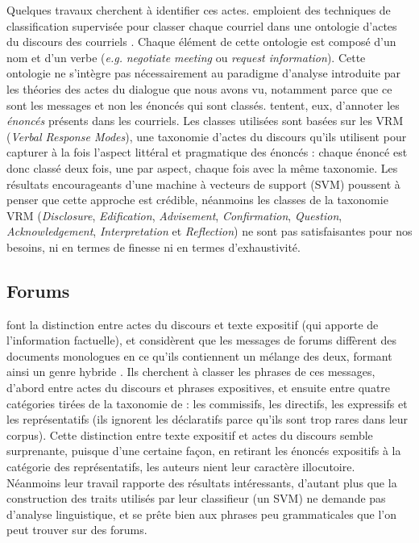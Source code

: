 \documentclass[10pt,a4paper,twoside]{article}
\begin{document}
Quelques travaux cherchent à identifier ces actes. \citet{cohen2004learning} emploient des techniques de classification supervisée pour classer chaque courriel dans une ontologie d'\og actes du discours des courriels \fg. Chaque élément de cette ontologie est composé d'un nom et d'un verbe (\textit{e.g.} \textit{negotiate meeting} ou \textit{request information}). Cette ontologie ne s'intègre pas nécessairement au paradigme d'analyse introduite par les théories des actes du dialogue que nous avons vu, notamment parce que ce sont les messages et non les énoncés qui sont classés. \citet{lampert2006classifying} tentent, eux, d'annoter les \textit{énoncés} présents dans les courriels. Les classes utilisées sont basées sur les VRM (\textit{Verbal Response Modes}), une taxonomie d'actes du discours qu'ils utilisent pour capturer à la fois l'aspect littéral et pragmatique des énoncés : chaque énoncé est donc classé deux fois, une par aspect, chaque fois avec la même taxonomie. Les résultats encourageants d'une machine à vecteurs de support (SVM) poussent \citeauthor{lampert2009segmenting} à penser que cette approche est crédible, néanmoins les classes de la taxonomie VRM (\textit{Disclosure}, \textit{Edification}, \textit{Advisement}, \textit{Confirmation}, \textit{Question}, \textit{Acknowledgement}, \textit{Interpretation} et \textit{Reflection}) ne sont pas satisfaisantes pour nos besoins, ni en termes de finesse ni en termes d'exhaustivité.

\subsection{Forums}
\label{subsec:forums}

\citet{qadir2011classifying} font la distinction entre actes du discours et texte expositif (qui apporte de l'information factuelle), et considèrent que les messages de forums diffèrent des documents monologues en ce qu'ils contiennent un mélange des deux, formant ainsi un genre \og hybride \fg. Ils cherchent à classer les phrases de ces messages, d'abord entre actes du discours et phrases expositives, et ensuite entre quatre catégories tirées de la taxonomie de \citet{searle1976taxonomy} : les commissifs, les directifs, les expressifs et les représentatifs (ils ignorent les déclaratifs parce qu'ils sont trop rares dans leur corpus). Cette distinction entre texte expositif et actes du discours semble surprenante, puisque d'une certaine façon, en retirant les énoncés expositifs à la catégorie des représentatifs, les auteurs nient leur caractère illocutoire. Néanmoins leur travail rapporte des résultats intéressants, d'autant plus que la construction des traits utilisés par leur classifieur (un SVM) ne demande pas d'analyse linguistique, et se prête bien aux phrases peu grammaticales que l'on peut trouver sur des forums.
\end{document}

